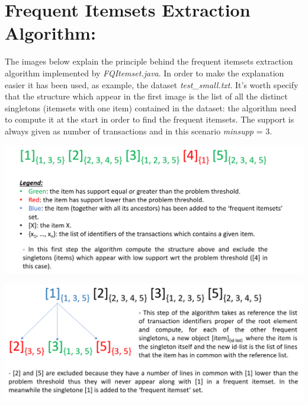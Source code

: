 \documentclass[]{report}
\begin{document}
\section*{Frequent Itemsets Extraction Algorithm:}
	
	The images below explain the principle behind the frequent itemsets extraction algorithm implemented by \textit{FQItemset.java}. In order to make the explanation easier it has been used, as example, the dataset \textit{test\_small.txt}. It's worth specify that the structure which appear in the first image is the list of all the distinct singletons (itemsets with one item) contained in the dataset: the algorithm need to compute it at the start in order to find the frequent itemsets. The support is always given as number of transactions and in this scenario \textit{minsupp} = 3. \\

	\centerline{\includegraphics[scale=0.5]{./img/alg1}}

	\centerline{\includegraphics[scale=0.5]{./img/alg2}}
	
\end{document}
